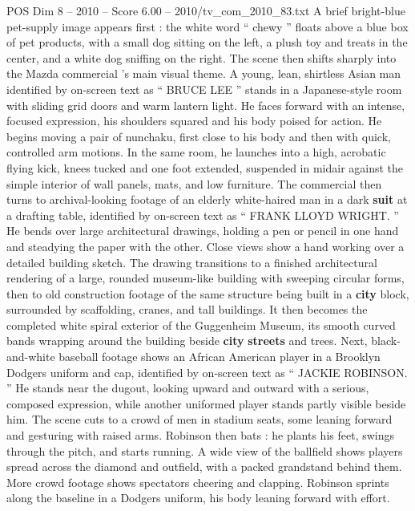 \begin{textsample}{POS Dim 8 – 2010 – Score 6.00 – 2010/tv\_com\_2010\_83.txt}  \label{ex:f8_pos_029}
A brief bright-blue pet-supply image appears first : the white word “ chewy ” floats above a blue box of pet products, with a small dog sitting on the left, a plush toy and treats in the center, and a white dog sniffing on the right.
The scene then shifts sharply into the Mazda commercial ’s main visual theme.
A young, lean, shirtless Asian man identified by on-screen text as “ BRUCE LEE ” stands in a Japanese-style room with sliding grid doors and warm lantern light.
He faces forward with an intense, focused expression, his shoulders squared and his body poised for action.
He begins moving a pair of nunchaku, first close to his body and then with quick, controlled arm motions.
In the same room, he launches into a high, acrobatic flying kick, knees tucked and one foot extended, suspended in midair against the simple interior of wall panels, mats, and low furniture.
The commercial then turns to archival-looking footage of an elderly white-haired man in a dark \textbf{suit} at a drafting table, identified by on-screen text as “ FRANK LLOYD WRIGHT. ” He bends over large architectural drawings, holding a pen or pencil in one hand and steadying the paper with the other.
Close views show a hand working over a detailed building sketch.
The drawing transitions to a finished architectural rendering of a large, rounded museum-like building with sweeping circular forms, then to old construction footage of the same structure being built in a \textbf{city} block, surrounded by scaffolding, cranes, and tall buildings.
It then becomes the completed white spiral exterior of the Guggenheim Museum, its smooth curved bands wrapping around the building beside \textbf{city} \textbf{streets} and trees.
Next, black-and-white baseball footage shows an African American player in a Brooklyn Dodgers uniform and cap, identified by on-screen text as “ JACKIE ROBINSON. ” He stands near the dugout, looking upward and outward with a serious, composed expression, while another uniformed player stands partly visible beside him.
The scene cuts to a crowd of men in stadium seats, some leaning forward and gesturing with raised arms.
Robinson then bats : he plants his feet, swings through the pitch, and starts running.
A wide view of the ballfield shows players spread across the diamond and outfield, with a packed grandstand behind them.
More crowd footage shows spectators cheering and clapping.
Robinson sprints along the baseline in a Dodgers uniform, his body leaning forward with effort.

\end{textsample}
